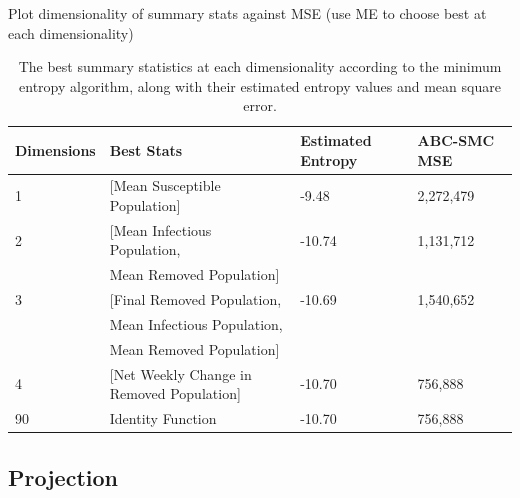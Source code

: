 \documentclass[11pt,a4paper]{article}
\theoremstyle{break}
\begin{document}
  Plot dimensionality of summary stats against MSE (use ME to choose best at each dimensionality)

  \begin{table}[H]
    \centering
    \begin{tabular}{|l|l|l|l|}
      \hline
      \textbf{Dimensions}&\textbf{Best Stats}&\textbf{Estimated Entropy}&\textbf{ABC-SMC MSE}\\\hline
      1&[Mean Susceptible Population]&-9.48&2,272,479\\\hline
      2&[Mean Infectious Population,&-10.74&1,131,712\\
      &Mean Removed Population]&&\\\hline
      3&[Final Removed Population,&-10.69&1,540,652\\
      &Mean Infectious Population,&&\\
      &Mean Removed Population]&&\\\hline
      4&[Net Weekly Change in Removed Population]&-10.70&756,888\\\hline
      90&Identity Function&-10.70&756,888\\\hline
    \end{tabular}
    \caption{The best summary statistics at each dimensionality according to the minimum entropy algorithm, along with their estimated entropy values and mean square error.}
    \label{table_dimensionality_of_summary_statistics}
  \end{table}

\subsection{Projection}\label{sec_projection}
\end{document}
